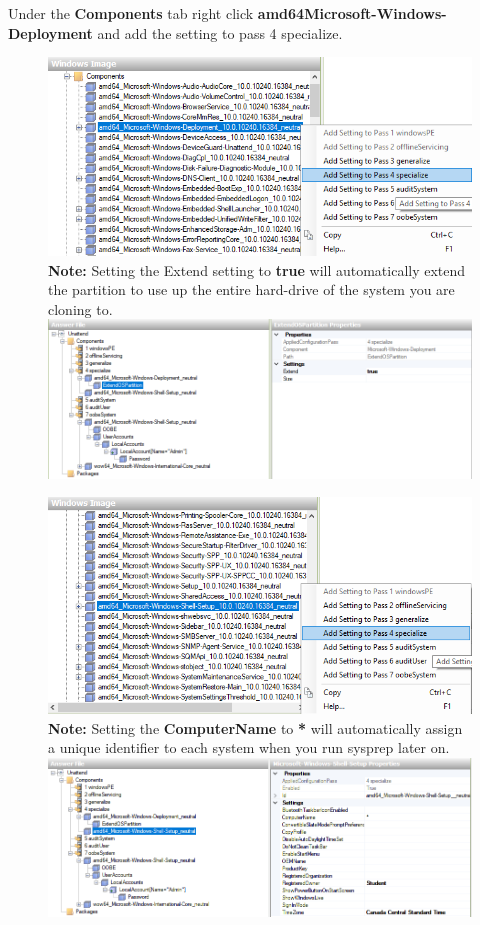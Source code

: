 \documentclass{article}
\begin{document}
\newpage
Under the \textbf{Components} tab right click \textbf{amd64\textunderscore Microsoft-Windows-Deployment} and add the setting to pass 4 specialize.
\begin{figure}[h]
	\includegraphics[width=1\linewidth]{"sysprep/3-23-2018 13-29-07"}
	\newline
	\textbf{Note:} Setting the Extend setting to \textbf{true} will automatically extend the partition to use up the entire hard-drive of the system you are cloning to.
	\includegraphics[width=1\linewidth]{"sysprep/3-23-2018 13-34-39"}
\end{figure}
\newpage
\begin{figure}[h]
	\includegraphics[width=1\linewidth]{"sysprep/3-23-2018 13-29-44"}
	\newline
	\textbf{Note:} Setting the \textbf{ComputerName} to \textbf{*} will automatically assign a unique identifier to each system when you run sysprep later on.
	\includegraphics[width=1\linewidth]{"sysprep/3-23-2018 13-35-03"}
\end{figure}
\end{document}
